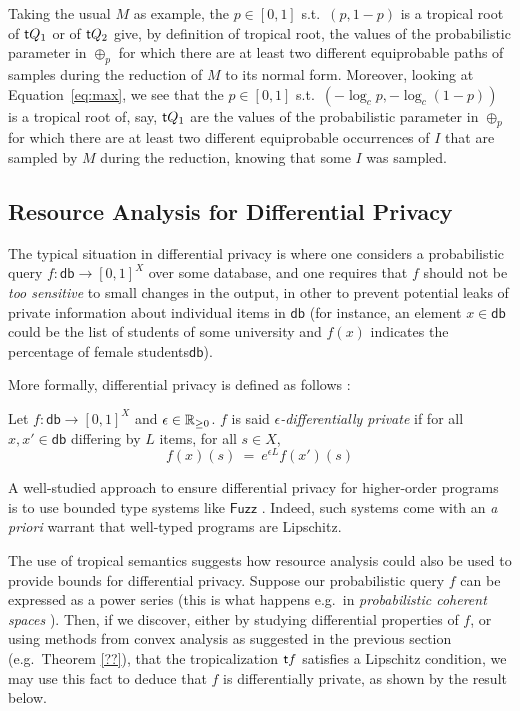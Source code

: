 \begin{remark}
 Taking the usual $M$ as example, the $p\in[0,1]$ s.t.\ $(p,1-p)$ is a tropical root of $\mathsf{t} Q_1$ or of $\mathsf{t} Q_2$ give, by definition of tropical root, the values of the probabilistic parameter in $\oplus_p$ for which there are at least two different equiprobable paths of samples during the reduction of $M$ to its normal form.
 Moreover, looking at Equation~\ref{eq:max}, we see that the $p\in[0,1]$ s.t.\ $(-\log_c p,-\log_c(1-p))$ is a tropical root of, say, $\mathsf{t} Q_1$ are the values of the probabilistic parameter in $\oplus_p$ for which there are at least two different equiprobable occurrences of $I$ that are sampled by $M$ during the reduction, knowing that some $I$ was sampled.
\end{remark}


\subsection{Resource Analysis for Differential Privacy}

The typical situation in differential privacy is where one considers a probabilistic query $f: \mathsf{db}\to [0,1]^{X}$ over some database, and one requires that $f$ should not be \emph{too sensitive} to small changes in the output, in other to prevent potential leaks of private information about individual items in $\mathsf{db}$ (for instance, an element $x\in\mathsf{db}$ could be the list of students of some university and $f(x)$ indicates the percentage of female students$\mathsf{db}$).

More formally, differential privacy is defined as follows \cite{Reed2010}:
\begin{definition}
Let $f: \mathsf{db}\to [0,1]^{X}$ and $\epsilon \in \mathbb{R}_{\geq 0}$. $f$ is said \emph{$\epsilon$-differentially private} if for all $x,x'\in \mathsf{db}$
differing by $L$ items, for all $s\in X$, 
$$
f(x)(s) \ = \ e^{\epsilon L} f(x')(s)
$$
\end{definition}

A well-studied approach to ensure differential privacy for higher-order programs is to use bounded type systems like $\mathsf{Fuzz}$ \cite{Reed2010}. Indeed, such systems come with an \emph{a priori} warrant that well-typed programs are Lipschitz.

The use of tropical semantics suggests how resource analysis could also be used to provide bounds for differential privacy. 
Suppose our probabilistic query $f$ can be expressed as a power series (this is what happens e.g.~in \emph{probabilistic coherent spaces} \cite{Ehrhard2011}). Then, if we discover, either by studying differential properties of $f$, or using methods from convex analysis as suggested in the previous section (e.g.~Theorem \ref{??}), 
 that the tropicalization $\mathsf{t} f$ satisfies a Lipschitz condition, we may use this fact to deduce that $f$ is differentially private, as shown by the result below.


